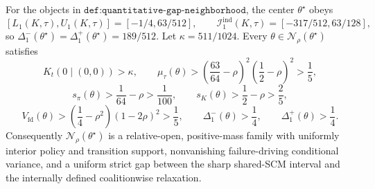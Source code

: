 For the objects in \(\texttt{def:quantitative-gap-neighborhood}\), the center \(\theta^\star\) obeys
\[
 [L_1(K,\tau),U_1(K,\tau)]=[-1/4,63/512],
 \qquad
 \mathcal I_1^{\mathrm{ind}}(K,\tau)=[-317/512,63/128],
\]
so \(\Delta_1^-(\theta^\star)=\Delta_1^+(\theta^\star)=189/512\).  Let \(\kappa=511/1024\).  Every \(\theta\in\mathcal N_\rho(\theta^\star)\) satisfies
\[
 K_t(0\mid(0,0))>\kappa,
 \qquad
 \mu_\tau(\theta)>\left(\frac{63}{64}-\rho\right)^2
                         \left(\frac12-\rho\right)^2>\frac15,
\]
\[
 s_\pi(\theta)>\frac1{64}-\rho>\frac1{100},
 \qquad
 s_K(\theta)>\frac12-\rho>\frac25,
\]
\[
 V_{\mathrm{fd}}(\theta)>\left(\frac14-\rho^2\right)(1-2\rho)^2>\frac15,
 \qquad
 \Delta_1^-(\theta)>\frac14,
 \qquad
 \Delta_1^+(\theta)>\frac14.
\]
Consequently \(\mathcal N_\rho(\theta^\star)\) is a relative-open, positive-mass family with uniformly interior policy and transition support, nonvanishing failure-driving conditional variance, and a uniform strict gap between the sharp shared-SCM interval and the internally defined coalitionwise relaxation.